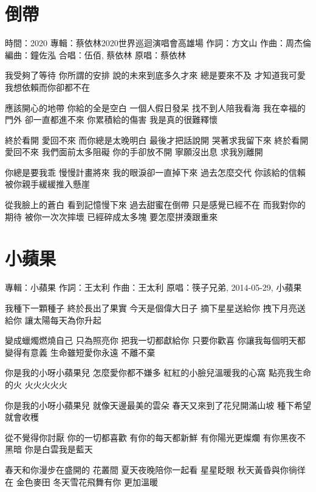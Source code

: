 \documentclass[UTF8,a4paper,oneside,twocolumn,12pt]{ctexbook}
\newcommand{\infopair}[2]{\textbullet #1：#2}
\newcommand{\zc}[1][伍佰]{\infopair{作詞}{#1}}
\newcommand{\zq}[1][伍佰]{\infopair{作曲}{#1}}
\newcommand{\bq}[1][伍佰]{\infopair{編曲}{#1}}
\newcommand{\zj}[1]{\infopair{專輯}{#1}}
\newcommand{\yc}[1]{\infopair{原唱}{#1}}
\newcommand{\sj}[1]{\infopair{時間}{#1}}
\newenvironment{info}{\begin{flushleft}\kaishu
	}
	{\end{flushleft}\normalsize\yahei\par}
\newenvironment{lyric}{
	}
{}
\begin{document}
\section{倒帶}
\begin{info}
	\sj{2020}
	\zj{蔡依林2020世界巡迴演唱會高雄場}
	\zc[方文山]
	\zq[周杰倫]
	\bq[鐘佐泓]
	\infopair{合唱}{伍佰, 蔡依林}
	\yc{蔡依林}
\end{info}
\begin{lyric}
	我受夠了等待 你所謂的安排
	說的未來到底多久才來
	總是要來不及 才知道我可愛
	我想依賴而你卻都不在

	應該開心的地帶 你給的全是空白
	一個人假日發呆 找不到人陪我看海
	我在幸福的門外 卻一直都進不來
	你累積給的傷害 我是真的很難釋懷

	終於看開 愛回不來 而你總是太晚明白
	最後才把話說開 哭著求我留下來
	終於看開 愛回不來 我們面前太多阻礙
	你的手卻放不開 寧願沒出息 求我別離開

	你總是要我乖 慢慢計畫將來
	我的眼淚卻一直掉下來
	過去怎麼交代 你該給的信賴
	被你親手緩緩推入懸崖

	從我臉上的蒼白 看到記憶慢下來
	過去甜蜜在倒帶 只是感覺已經不在
	而我對你的期待 被你一次次摔壞
	已經碎成太多塊 要怎麼拼湊跟重來
\end{lyric}

\section{小蘋果}
\begin{info}
	\zj{小蘋果}
	\zc[王太利]
	\zq[王太利]
	\yc{筷子兄弟, 2014-05-29, 小蘋果}
\end{info}
\begin{lyric}
	我種下一顆種子 終於長出了果實
	今天是個偉大日子
	摘下星星送給你 拽下月亮送給你
	讓太陽每天為你升起

	變成蠟燭燃燒自己 只為照亮你
	把我一切都獻給你 只要你歡喜
	你讓我每個明天都 變得有意義
	生命雖短愛你永遠 不離不棄

	你是我的小呀小蘋果兒
	怎麼愛你都不嫌多
	紅紅的小臉兒溫暖我的心窩
	點亮我生命的火 火火火火火

	你是我的小呀小蘋果兒
	就像天邊最美的雲朵
	春天又來到了花兒開滿山坡
	種下希望就會收穫

	從不覺得你討厭 你的一切都喜歡
	有你的每天都新鮮
	有你陽光更燦爛 有你黑夜不黑暗
	你是白雲我是藍天

	春天和你漫步在盛開的 花叢間
	夏天夜晚陪你一起看 星星眨眼
	秋天黃昏與你徜徉在 金色麥田
	冬天雪花飛舞有你 更加溫暖
\end{lyric}
\end{document}
